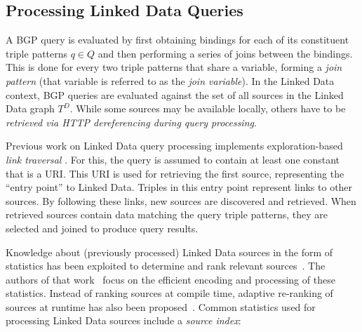 \subsection{Processing Linked Data Queries} A BGP query is evaluated by
first obtaining bindings for each of its constituent triple patterns $q
\in Q$ and then performing a series of joins between the bindings. This is done for every two triple patterns that share a
variable, forming a \emph{join pattern} (that variable is referred to
as the \emph{join variable}). 
In the Linked Data context, BGP queries are 
evaluated against the set of all sources in the Linked Data graph $T^D$. 
While some sources may be available locally, others have
to be \emph{retrieved via HTTP dereferencing during query processing}. 

Previous work on Linked Data query processing
implements exploration-based \emph{link traversal} 
\cite{hartig_executing_2009,hartig_zero_2011}. 
For this, the query is assumed to contain at least one constant that is a URI. This URI is used for retrieving
the first source, representing the ``entry point'' to Linked Data. Triples in this entry point represent links to other sources. By following these links, new
sources are discovered and retrieved. When retrieved sources contain data matching the query triple patterns, they are selected and joined to produce query results. 

Knowledge about (previously processed) Linked Data sources in the form of statistics has been exploited 
to determine and rank relevant sources~\cite{harth_data_2010}. 
The authors of that work~\cite{harth_data_2010} focus on the efficient encoding and processing of these statistics. Instead of ranking sources at compile time, adaptive re-ranking of sources at runtime has also been proposed~\cite{ladwig_linked_2010}. Common statistics used for processing Linked Data sources include a \emph{source index}:


